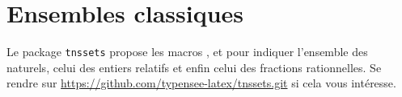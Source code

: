 \documentclass[12pt,a4paper]{article}
\begin{document}
\section{Ensembles classiques}

Le package \verb+tnssets+ propose les macros ,  et  pour indiquer l'ensemble des naturels, celui des entiers relatifs et enfin celui des fractions rationnelles.
Se rendre sur \url{https://github.com/typensee-latex/tnssets.git} si cela vous intéresse. 
\end{document}
